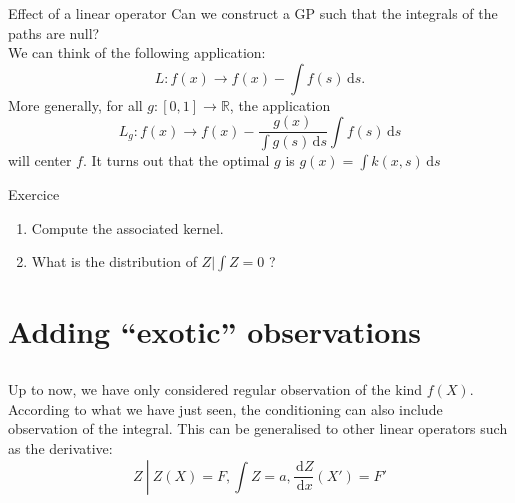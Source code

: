 \documentclass{beamer}
\newcommand\dx{\, \mathrm{d}}
\begin{document}
\begin{frame}{Effect of a linear operator}
Can we construct a GP such that the integrals of the paths are null?\\ \vspace{3mm}
We can think of the following application:
$$ L : f(x) \rightarrow f(x) - \int f(s) \dx s.$$
More generally, for all $g: [0,1] \rightarrow \mathds{R}$, the application
$$ L_g : f(x) \rightarrow f(x) - \frac{g(x)}{\int g(s) \dx s}\int f(s) \dx s$$
will center $f$. It turns out that the optimal $g$ is $g(x) =\int k(x,s) \dx s$
\begin{exampleblock}{Exercice}
\begin{enumerate}
	\item Compute the associated kernel.
	\item What is the distribution of $Z|\int Z = 0$ ?
\end{enumerate}
\end{exampleblock}
\end{frame}

\section[Exotic obs.]{Adding ``exotic'' observations}
\subsection{}

\begin{frame}{}
Up to now, we have only considered regular observation of the kind $f(X)$. \\ \vspace{5mm}
According to what we have just seen, the conditioning can also include observation of the integral. This can be generalised to other linear operators such as the derivative:
$$ Z \ \left| \ Z(X) = F, \int Z = a, \frac{\dx Z}{\dx x}(X')= F' \right. $$
\end{frame}
\end{document}
